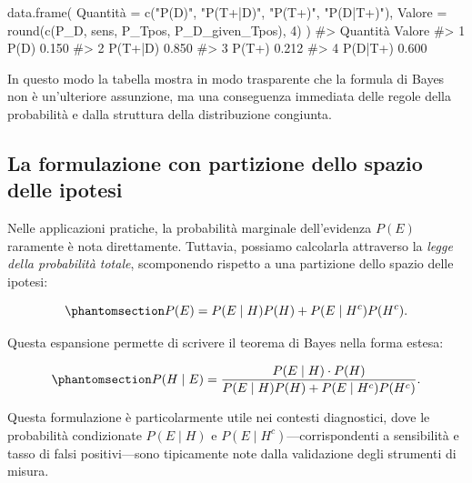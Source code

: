 \documentclass[
  letterpaper,
  DIV=11,
  numbers=noendperiod,
  oneside]{scrreprt}
\newenvironment{Shaded}{\begin{snugshade}}{\end{snugshade}}
\newcommand{\AttributeTok}[1]{\textcolor[rgb]{0.40,0.45,0.13}{#1}}
\newcommand{\CommentTok}[1]{\textcolor[rgb]{0.37,0.37,0.37}{#1}}
\newcommand{\DecValTok}[1]{\textcolor[rgb]{0.68,0.00,0.00}{#1}}
\newcommand{\FunctionTok}[1]{\textcolor[rgb]{0.28,0.35,0.67}{#1}}
\newcommand{\NormalTok}[1]{\textcolor[rgb]{0.00,0.23,0.31}{#1}}
\newcommand{\OtherTok}[1]{\textcolor[rgb]{0.00,0.23,0.31}{#1}}
\newcommand{\StringTok}[1]{\textcolor[rgb]{0.13,0.47,0.30}{#1}}
\theoremstyle{definition}
\theoremstyle{plain}
\theoremstyle{definition}
\theoremstyle{remark}
\begin{document}
\begin{Shaded}
\begin{Highlighting}[]
\FunctionTok{data.frame}\NormalTok{(}
\NormalTok{  Quantità }\OtherTok{=} \FunctionTok{c}\NormalTok{(}\StringTok{"P(D)"}\NormalTok{, }\StringTok{"P(T+|D)"}\NormalTok{, }\StringTok{"P(T+)"}\NormalTok{, }\StringTok{"P(D|T+)"}\NormalTok{),}
  \AttributeTok{Valore   =} \FunctionTok{round}\NormalTok{(}\FunctionTok{c}\NormalTok{(P\_D, sens, P\_Tpos, P\_D\_given\_Tpos), }\DecValTok{4}\NormalTok{)}
\NormalTok{)}
\CommentTok{\#\textgreater{}   Quantità Valore}
\CommentTok{\#\textgreater{} 1     P(D)  0.150}
\CommentTok{\#\textgreater{} 2  P(T+|D)  0.850}
\CommentTok{\#\textgreater{} 3    P(T+)  0.212}
\CommentTok{\#\textgreater{} 4  P(D|T+)  0.600}
\end{Highlighting}
\end{Shaded}

In questo modo la tabella mostra in modo trasparente che la formula di
Bayes non è un'ulteriore assunzione, ma una conseguenza immediata delle
regole della probabilità e dalla struttura della distribuzione
congiunta.

\subsection{La formulazione con partizione dello spazio delle
ipotesi}\label{la-formulazione-con-partizione-dello-spazio-delle-ipotesi}

Nelle applicazioni pratiche, la probabilità marginale dell'evidenza
\(P(E)\) raramente è nota direttamente. Tuttavia, possiamo calcolarla
attraverso la \emph{legge della probabilità totale}, scomponendo
rispetto a una partizione dello spazio delle ipotesi:

\begin{equation}\phantomsection\label{eq-evidence-partition}{
P(E) = P(E \mid H) P(H) + P(E \mid H^c) P(H^c).
}\end{equation}

Questa espansione permette di scrivere il teorema di Bayes nella forma
estesa:

\begin{equation}\phantomsection\label{eq-bayes-expanded}{
P(H \mid E) = \frac{P(E \mid H) \cdot P(H)}{P(E \mid H) P(H) + P(E \mid H^c) P(H^c)}.
}\end{equation}

Questa formulazione è particolarmente utile nei contesti diagnostici,
dove le probabilità condizionate \(P(E \mid H)\) e
\(P(E \mid H^c)\)---corrispondenti a sensibilità e tasso di falsi
positivi---sono tipicamente note dalla validazione degli strumenti di
misura.
\end{document}
